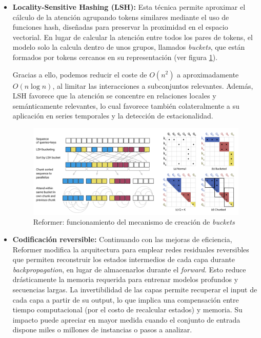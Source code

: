 \begin{itemize}
	\item \textbf{Locality-Sensitive Hashing (LSH):} Esta técnica permite aproximar el cálculo de la atención agrupando tokens similares mediante el uso de funciones hash, diseñadas para preservar la proximidad en el espacio vectorial. En lugar de calcular la atención entre todos los pares de tokens, el modelo solo la calcula dentro de unos grupos, llamados \textit{buckets}, que están formados por tokens cercanos en su representación (ver figura \ref{reformer}).
	
	Gracias a ello, podemos reducir el coste de \(O(n^2)\) a aproximadamente \(O(n \log n)\), al limitar las interacciones a subconjuntos relevantes. Además, LSH favorece que la atención se concentre en relaciones locales y semánticamente relevantes, lo cual favorece también colateralmente a su aplicación en series temporales y la detección de estacionalidad.
	
	\begin{figure}[!ht] %
		\centering
		\includegraphics[scale=0.225]{img/reformer}
		\caption{Reformer: funcionamiento del mecanismo de creación de \textit{buckets} \cite{kitaev2020reformerefficienttransformer}}
		\label{reformer}
	\end{figure}  	
	
	\item \textbf{Codificación reversible:} Continuando con las mejoras de eficiencia, Reformer modifica la arquitectura para emplear redes residuales reversibles que permiten reconstruir los estados intermedios de cada capa durante \textit{backpropagation}, en lugar de almacenarlos durante el \textit{forward}. Esto reduce drásticamente la memoria requerida para entrenar modelos profundos y secuencias largas. La invertibilidad de las capas permite recuperar el input de cada capa a partir de su output, lo que implica una compensación entre tiempo computacional (por el costo de recalcular estados) y memoria. Su impacto puede apreciar en mayor medida cuando el conjunto de entrada dispone miles o millones de instancias o pasos a analizar.
	
\end{itemize}

